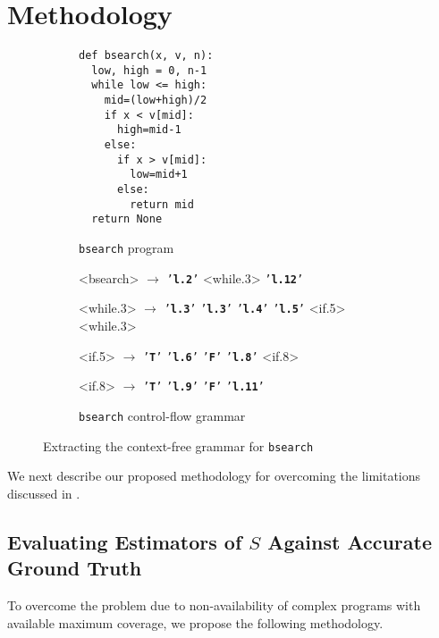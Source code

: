 \documentclass[conference,anonymous,review]{IEEEtran}
\def\<#1>{\texttt{#1}}
\def\term#1{\texttt{'\textbf{#1}'}}
\begin{document}
\section{Methodology} \label{sec:method}
\begin{figure*} %
  \centering
\begin{subfigure}[h]{0.45\textwidth} %
  \centering
{} %
\begin{lstlisting}[style=Python, escapechar=|,numbersep=2pt]
def bsearch(x, v, n):
  low, high = 0, n-1
  while low <= high:
    mid=(low+high)/2
    if x < v[mid]:
      high=mid-1
    else:
      if x > v[mid]:
        low=mid+1
      else:
        return mid
  return None
\end{lstlisting}
\caption{\<bsearch> program}
\label{fig:bsearch1}
\end{subfigure}
\begin{subfigure}[h]{0.45\textwidth}   %
  \centering
\begin{grammar}%
  <bsearch> $\rightarrow$ \term{l.2} <while.3> \term{l.12}

  <while.3> $\rightarrow$ \term{l.3}
   \alt \term{l.3} \term{l.4} \term{l.5} <if.5> <while.3>

  <if.5>  $\rightarrow$  \term{T} \term{l.6}
   \alt \term{F} \term{l.8} <if.8>

  <if.8> $\rightarrow$ \term{T} \term{l.9}
   \alt \term{F} \term{l.11}
\end{grammar}
\caption{\<bsearch> control-flow grammar}
\label{fig:bsearch3}
\end{subfigure}
\caption{Extracting the context-free grammar for \<bsearch>}
\label{fig:bsearch}
\end{figure*}
We next describe our proposed methodology for overcoming the limitations discussed in .
\subsection{Evaluating Estimators of \texorpdfstring{$S$}{S} Against Accurate Ground Truth}
To overcome the problem due to non-availability of complex programs with available
maximum coverage, we propose the following methodology.
\end{document}
